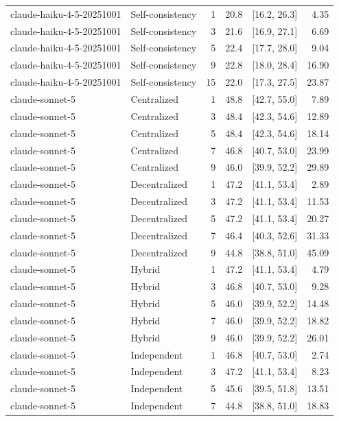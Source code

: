 \begin{tabular}{@{}llrrrr@{}}
claude-haiku-4-5-20251001 & Self-consistency & 1 & 20.8 & [16.2, 26.3] & 4.35 \\
claude-haiku-4-5-20251001 & Self-consistency & 3 & 21.6 & [16.9, 27.1] & 6.69 \\
claude-haiku-4-5-20251001 & Self-consistency & 5 & 22.4 & [17.7, 28.0] & 9.04 \\
claude-haiku-4-5-20251001 & Self-consistency & 9 & 22.8 & [18.0, 28.4] & 16.90 \\
claude-haiku-4-5-20251001 & Self-consistency & 15 & 22.0 & [17.3, 27.5] & 23.87 \\
claude-sonnet-5 & Centralized & 1 & 48.8 & [42.7, 55.0] & 7.89 \\
claude-sonnet-5 & Centralized & 3 & 48.4 & [42.3, 54.6] & 12.89 \\
claude-sonnet-5 & Centralized & 5 & 48.4 & [42.3, 54.6] & 18.14 \\
claude-sonnet-5 & Centralized & 7 & 46.8 & [40.7, 53.0] & 23.99 \\
claude-sonnet-5 & Centralized & 9 & 46.0 & [39.9, 52.2] & 29.89 \\
claude-sonnet-5 & Decentralized & 1 & 47.2 & [41.1, 53.4] & 2.89 \\
claude-sonnet-5 & Decentralized & 3 & 47.2 & [41.1, 53.4] & 11.53 \\
claude-sonnet-5 & Decentralized & 5 & 47.2 & [41.1, 53.4] & 20.27 \\
claude-sonnet-5 & Decentralized & 7 & 46.4 & [40.3, 52.6] & 31.33 \\
claude-sonnet-5 & Decentralized & 9 & 44.8 & [38.8, 51.0] & 45.09 \\
claude-sonnet-5 & Hybrid & 1 & 47.2 & [41.1, 53.4] & 4.79 \\
claude-sonnet-5 & Hybrid & 3 & 46.8 & [40.7, 53.0] & 9.28 \\
claude-sonnet-5 & Hybrid & 5 & 46.0 & [39.9, 52.2] & 14.48 \\
claude-sonnet-5 & Hybrid & 7 & 46.0 & [39.9, 52.2] & 18.82 \\
claude-sonnet-5 & Hybrid & 9 & 46.0 & [39.9, 52.2] & 26.01 \\
claude-sonnet-5 & Independent & 1 & 46.8 & [40.7, 53.0] & 2.74 \\
claude-sonnet-5 & Independent & 3 & 47.2 & [41.1, 53.4] & 8.23 \\
claude-sonnet-5 & Independent & 5 & 45.6 & [39.5, 51.8] & 13.51 \\
claude-sonnet-5 & Independent & 7 & 44.8 & [38.8, 51.0] & 18.83 \\

\end{tabular}
